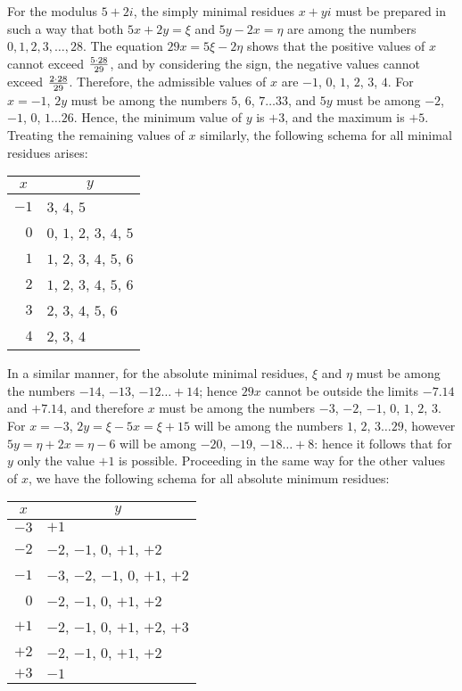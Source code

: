 \documentclass[twoside,12pt]{memoir}
\let\oldfrac\frac
\def\frac#1#2{\mathchoice{\tfrac{#1}{#2}}{\oldfrac{#1}{#2}}{\genfrac{}{}{}{2}{#1}{#2\mathstrut}}{\genfrac{}{}{}{3}{#1}{#2\mathstrut}}}
\begin{document}
For the modulus \(5+2i\), the simply minimal residues \(x+yi\) must be prepared in such a way that both \(5x+2y=\xi\) and \(5y-2x=\eta\) are among the numbers \(0, 1, 2, 3, \ldots, 28\). The equation \(29x=5\xi-2\eta\) shows that the positive values of \(x\) cannot exceed \(\frac{5 \cdot 28}{29}\), and by considering the sign, the negative values cannot exceed \(\frac{2 \cdot 28}{29}\). Therefore, the admissible values of \(x\) are \(-1\), \(0\), \(1\), \(2\), \(3\), \(4\). For \(x=-1\), \(2y\) must be among the numbers \(5\), \(6\), \(7 \ldots 33\), and \(5y\) must be among \(-2\), \(-1\), \(0\), \(1 \ldots 26\). Hence, the minimum value of \(y\) is \(+3\), and the maximum is \(+5\). Treating the remaining values of \(x\) similarly, the following schema for all minimal residues arises:\pagebreak%
\begin{center}
\begin{tabular}{r|l}
\multicolumn{1}{c|}{\(x\)} & \multicolumn{1}{c}{\(y\)} \\
\hline
\(-1\) & \(3\), \(4\), \(5\) \\
\(0\) & \(0\), \(1\), \(2\), \(3\), \(4\), \(5\) \\
\(1\) & \(1\), \(2\), \(3\), \(4\), \(5\), \(6\) \\
\(2\) & \(1\), \(2\), \(3\), \(4\), \(5\), \(6\) \\
\(3\) & \(2\), \(3\), \(4\), \(5\), \(6\) \\
\(4\) & \(2\), \(3\), \(4\) \\
\end{tabular}
\end{center}

In a similar manner, for the absolute minimal residues, \(\xi\) and \(\eta\) must be among the numbers \(-14\), \(-13\), \(-12 \ldots+14\); hence \(29 x\) cannot be outside the limits \(-7.14\) and \(+7.14\), and therefore \(x\) must be among the numbers \(-3\), \(-2\), \(-1\), \(0\), \(1\), \(2\), \(3\). For \(x=-3\), \(2 y=\xi-5 x=\xi+15\) will be among the numbers \(1\), \(2\), \(3 \ldots 29\), however \(5 y=\eta+2 x=\eta-6\) will be among \(-20\), \(-19\), \(-18 \ldots+8\): hence it follows that for \(y\) only the value \(+1\) is possible. Proceeding in the same way for the other values of \(x\), we have the following schema for all absolute minimum residues:
\begin{center}
\begin{tabular}{r|l}
\multicolumn{1}{c|}{\(x\)} & \multicolumn{1}{c}{\(y\)} \\
\hline
\(-3\) & \(+1\) \\
\(-2\) & \(-2\), \(-1\), \(0\), \(+1\), \(+2\) \\
\(-1\) & \(-3\), \(-2\), \(-1\), \(0\), \(+1\), \(+2\) \\
\(0\) & \(-2\), \(-1\), \(0\), \(+1\), \(+2\) \\
\(+1\) & \(-2\), \(-1\), \(0\), \(+1\), \(+2\), \(+3\) \\
\(+2\) & \(-2\), \(-1\), \(0\), \(+1\), \(+2\) \\
\(+3\) & \(-1\) \\
\end{tabular}
\end{center}
\end{document}
